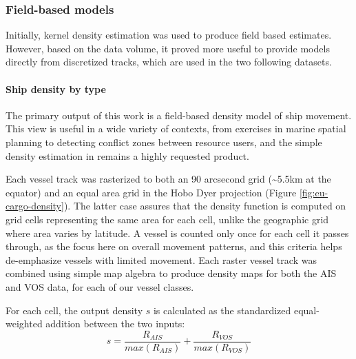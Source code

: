\subsubsection{Field-based models}

Initially, kernel density estimation was used to produce field based estimates. However, based on the data volume, it proved more useful to provide models directly from discretized tracks, which are used in the two following datasets.

\paragraph{Ship density by type}

The primary output of this work is a field-based density model of ship movement. This view is useful in a wide variety of contexts, from exercises in marine spatial planning to detecting conflict zones between resource users, and the simple density estimation in \cite{Halpern2008} remains a highly requested product. %

Each vessel track was rasterized to both an 90 arcsecond grid (\textasciitilde{}5.5km at the equator) and an equal area grid in the Hobo Dyer projection (Figure \ref{fig:eu-cargo-density}). The latter case assures that the density function is computed on grid cells representing the same area for each cell, unlike the geographic grid where area varies by latitude. A vessel is counted only once for each cell it passes through, as the focus here on overall movement patterns, and this criteria helps de-emphasize vessels with limited movement. Each raster vessel track was combined using simple map algebra to produce density maps for both the AIS and VOS data, for each of our vessel classes. %

For each cell, the output density $s$ is calculated as the standardized equal-weighted addition between the two inputs:
\begin{equation}
 s = \frac{R_{AIS}}{max(R_{AIS})} + \frac{R_{VOS}}{max(R_{VOS})} 
\end{equation}


